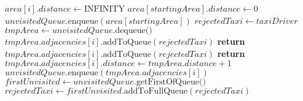 \begin{itemize}
\begin{algorithm}
\begin{algorithmic}[1]
					\Else
							\State $area[i].distance \gets \text{INFINITY} $
						\EndFor
						\State $area[startingArea].distance \gets 0$
						\State $ unvisitedQueue.\text{enqueue}(area[startingArea])$
						\State $ rejectedTaxi \gets taxiDriver$
							\State $ tmpArea \gets unvisitedQueue.\text{dequeue()} $
									\State $tmpArea.adjacencies[i].\text{addToQueue}(rejectedTaxi)$
									\State \textbf{return} 
								\EndIf
							\EndFor
									\State $tmpArea.adjacencies[i].\text{addToQueue}(rejectedTaxi)$
									\State \textbf{return} 
								\EndIf
									\State $tmpArea.adjacencies[i].distance \gets tmpArea.distance + 1$
									\State $ unvisitedQueue.\text{enqueue}(tmpArea.adjacencies[i])$
								\EndIf
							\EndFor
							\State $firstUnvisited \gets unvisitedQueue.\text{getFirstOfQueue()}$
							\State $rejectedTaxi \gets firstUnvisited.\text{addToFullQueue}(rejectedTaxi)$
						\EndWhile
					
					
					\EndIf
					\EndProcedure
				\end{algorithmic}
			\end{algorithm}
			
		\end{itemize}
	
	
	
%